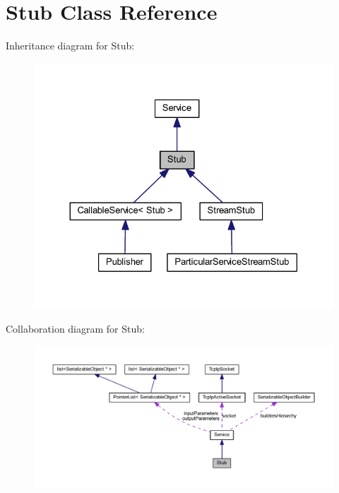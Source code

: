 \hypertarget{class_stub}{
\section{Stub Class Reference}
\label{class_stub}
}


Inheritance diagram for Stub:\nopagebreak
\begin{figure}[H]
\begin{center}
\leavevmode
\includegraphics[width=326pt]{class_stub__inherit__graph}
\end{center}
\end{figure}


Collaboration diagram for Stub:\nopagebreak
\begin{figure}[H]
\begin{center}
\leavevmode
\includegraphics[width=400pt]{class_stub__coll__graph}
\end{center}
\end{figure}
